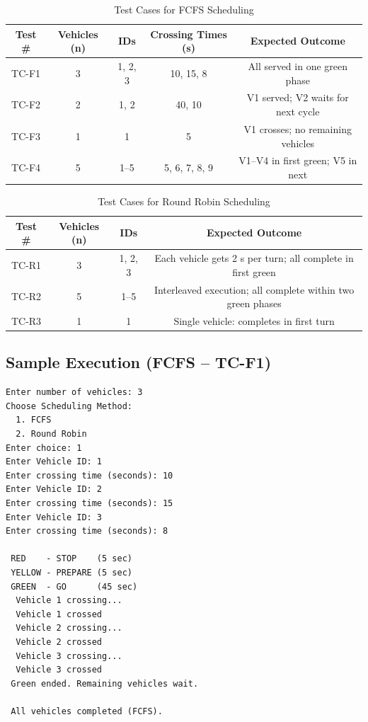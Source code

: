 \documentclass[12pt,a4paper]{article}
\begin{document}
\begin{table}[H]
\centering
\caption{Test Cases for FCFS Scheduling}
\label{tab:fcfs-test}
\begin{tabular}{ccccc}
\toprule
\textbf{Test \#} & \textbf{Vehicles (n)} & \textbf{IDs} & \textbf{Crossing Times (s)} & \textbf{Expected Outcome} \\
\midrule
TC-F1 & 3 & 1, 2, 3 & 10, 15, 8     & All served in one green phase \\
TC-F2 & 2 & 1, 2    & 40, 10        & V1 served; V2 waits for next cycle \\
TC-F3 & 1 & 1       & 5             & V1 crosses; no remaining vehicles \\
TC-F4 & 5 & 1--5    & 5, 6, 7, 8, 9 & V1--V4 in first green; V5 in next \\
\bottomrule
\end{tabular}
\end{table}

\begin{table}[H]
\centering
\caption{Test Cases for Round Robin Scheduling}
\label{tab:rr-test}
\begin{tabular}{cccc}
\toprule
\textbf{Test \#} & \textbf{Vehicles (n)} & \textbf{IDs} & \textbf{Expected Outcome} \\
\midrule
TC-R1 & 3 & 1, 2, 3 & Each vehicle gets 2 s per turn; all complete in first green \\
TC-R2 & 5 & 1--5    & Interleaved execution; all complete within two green phases \\
TC-R3 & 1 & 1       & Single vehicle: completes in first turn \\
\bottomrule
\end{tabular}
\end{table}

\subsection{Sample Execution (FCFS -- TC-F1)}

\begin{verbatim}
Enter number of vehicles: 3
Choose Scheduling Method:
  1. FCFS
  2. Round Robin
Enter choice: 1
Enter Vehicle ID: 1
Enter crossing time (seconds): 10
Enter Vehicle ID: 2
Enter crossing time (seconds): 15
Enter Vehicle ID: 3
Enter crossing time (seconds): 8

 RED    - STOP    (5 sec)
 YELLOW - PREPARE (5 sec)
 GREEN  - GO      (45 sec)
  Vehicle 1 crossing...
  Vehicle 1 crossed
  Vehicle 2 crossing...
  Vehicle 2 crossed
  Vehicle 3 crossing...
  Vehicle 3 crossed
 Green ended. Remaining vehicles wait.

 All vehicles completed (FCFS).
\end{verbatim}
\end{document}
